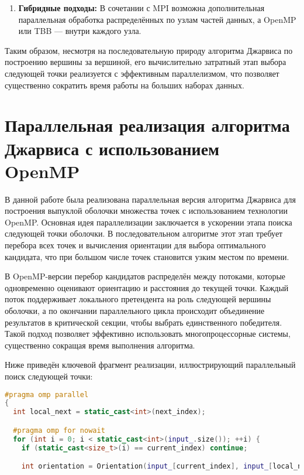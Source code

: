 \documentclass[a4paper,12pt]{article}
\begin{document}
\begin{itemize}
\begin{enumerate}
    \item \textbf{Гибридные подходы:}  
    В сочетании с MPI возможна дополнительная параллельная обработка распределённых по узлам частей данных, а OpenMP или TBB — внутри каждого узла.

\end{enumerate}

Таким образом, несмотря на последовательную природу алгоритма Джарвиса по построению вершины за вершиной, его вычислительно затратный этап выбора следующей точки реализуется с эффективным параллелизмом, что позволяет существенно сократить время работы на больших наборах данных.
\newpage
\section{Параллельная реализация алгоритма Джарвиса с использованием OpenMP}

В данной работе была реализована параллельная версия алгоритма Джарвиса для построения выпуклой оболочки множества точек с использованием технологии OpenMP. Основная идея параллелизации заключается в ускорении этапа поиска следующей точки оболочки. В последовательном алгоритме этот этап требует перебора всех точек и вычисления ориентации для выбора оптимального кандидата, что при большом числе точек становится узким местом по времени.

В OpenMP-версии перебор кандидатов распределён между потоками, которые одновременно оценивают ориентацию и расстояния до текущей точки. Каждый поток поддерживает локального претендента на роль следующей вершины оболочки, а по окончании параллельного цикла происходит объединение результатов в критической секции, чтобы выбрать единственного победителя. Такой подход позволяет эффективно использовать многопроцессорные системы, существенно сокращая время выполнения алгоритма.

Ниже приведён ключевой фрагмент реализации, иллюстрирующий параллельный поиск следующей точки:

\begin{lstlisting}[language=C++, caption={Параллельный выбор следующей точки оболочки с использованием OpenMP}]
#pragma omp parallel
{
  int local_next = static_cast<int>(next_index);

  #pragma omp for nowait
  for (int i = 0; i < static_cast<int>(input_.size()); ++i) {
    if (static_cast<size_t>(i) == current_index) continue;

    int orientation = Orientation(input_[current_index], input_[local_next], input_[i]);


\end{lstlisting}
\end{itemize}
\end{document}
